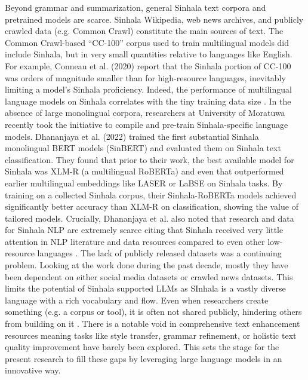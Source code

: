 \documentclass[12pt]{uomthesis}
\begin{document}
Beyond grammar and summarization, general Sinhala text corpora and pretrained models are scarce. Sinhala Wikipedia, web news archives, and publicly crawled data (e.g. Common Crawl) constitute the main sources of text. The Common Crawl-based “CC-100” \cite{13} corpus used to train multilingual models did include Sinhala, but in very small quantities relative to languages like English. For example, Conneau et al. (2020) report that the Sinhala portion of CC-100 was orders of magnitude smaller than for high-resource languages, inevitably limiting a model’s Sinhala proficiency. Indeed, the performance of multilingual language models on Sinhala correlates with the tiny training data size \cite{2}. In the absence of large monolingual corpora, researchers at University of Moratuwa recently took the initiative to compile and pre-train Sinhala-specific language models. Dhananjaya et al. (2022) trained the first substantial Sinhala monolingual BERT models (SinBERT) \cite{14} and evaluated them on Sinhala text classification. They found that prior to their work, the best available model for Sinhala was XLM-R (a multilingual RoBERTa) and even that outperformed earlier multilingual embeddings like LASER or LaBSE on Sinhala tasks. By training on a collected Sinhala corpus, their Sinhala-RoBERTa models achieved significantly better accuracy than XLM-R on classification, showing the value of tailored models. Crucially, Dhananjaya et al. also noted that research and data for Sinhala NLP are extremely scarce citing that Sinhala received very little attention in NLP literature and data resources compared to even other low-resource languages \cite{2}. The lack of publicly released datasets was a continuing problem. Looking at the work done during the past decade, mostly they have been dependent on either social media datasets or crawled news datasets. This limits the potential of Sinhala supported LLMs as SInhala is a vastly diverse language with a rich vocabulary and flow. Even when researchers create something (e.g. a corpus or tool), it is often not shared publicly, hindering others from building on it \cite{1}. There is a notable void in comprehensive text enhancement resources meaning tasks like style transfer, grammar refinement, or holistic text quality improvement have barely been explored. This sets the stage for the present research to fill these gaps by leveraging large language models in an innovative way.
\end{document}
